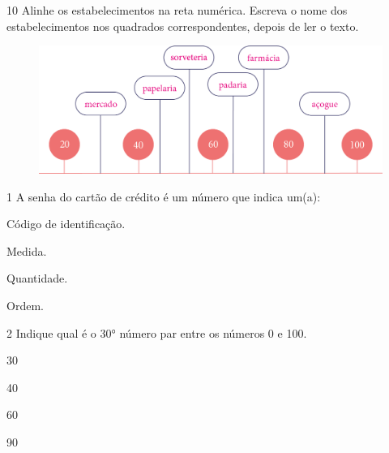 
\pagebreak
\num{10} Alinhe os estabelecimentos na reta numérica. Escreva o nome dos
estabelecimentos nos quadrados correspondentes, depois de ler o texto.

\begin{figure}[htpb!]
\includegraphics[width=\textwidth]{./media/image14.png}
\end{figure}






\num{1} A senha do cartão de crédito é um número que indica um(a):

\begin{escolha}
\item Código de identificação.

\item Medida.

\item Quantidade.

\item Ordem.
\end{escolha}

\num{2} Indique qual é o 30° número par entre os números 0 e 100.

\begin{escolha}
\item 30

\item 40

\item 60

\item 90
\end{escolha}

